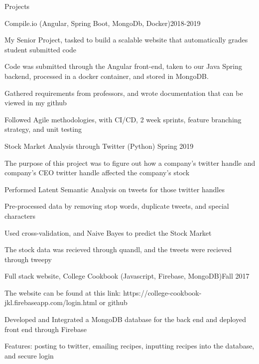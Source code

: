 \documentclass{resume} %
\begin{document}
\begin{rSection}{Projects}
\begin{rsemisection}{Compile.io (Angular, Spring Boot, MongoDb, Docker)}{2018-2019}
\item My Senior Project, tasked to build a scalable website that automatically grades student submitted code
\item Code was submitted through the Angular front-end, taken to our Java Spring backend, processed in a docker container, and stored in MongoDB.
\item Gathered requirements from professors, and wrote documentation that can be viewed in my github
\item Followed Agile methodologies, with CI/CD, 2 week sprints, feature branching strategy, and unit testing
\end{rsemisection}

\begin{rsemisection}{Stock Market Analysis through Twitter (Python) }{Spring 2019}
    \item The purpose of this project was to figure out how a company’s twitter handle and company’s CEO twitter handle affected the company’s stock
    \item Performed Latent Semantic Analysis on tweets for those twitter handles
    \item Pre-processed data by removing stop words, duplicate tweets, and special characters
    \item Used cross-validation, and Naive Bayes to predict the Stock Market
    \item The stock data was recieved through quandl, and the tweets were recieved through tweepy
\end{rsemisection}

\begin{rsemisection}{Full stack website, College Cookbook (Javascript, Firebase, MongoDB)}{Fall 2017}
\item The website can be found at this link: https://college-cookbook-jkl.firebaseapp.com/login.html or github
\item Developed and Integrated a MongoDB database for the back end and deployed front end through Firebase
\item Features: posting to twitter, emailing recipes, inputting recipes into the database, and secure login
\end{rsemisection}
\end{rSection}
\end{document}
